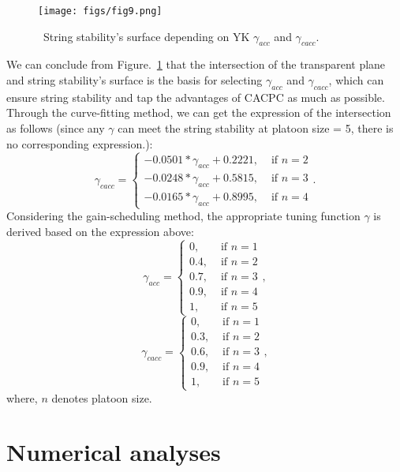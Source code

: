 \documentclass[journal]{IEEEtran}
\begin{document}
\begin{figure}
  \centering
  \texttt{[image: figs/fig9.png]}
  \caption{~String stability's surface depending on YK $\gamma_{acc}$ and $\gamma_{cacc}$.}
  \label{fig9}
\end{figure}
We can conclude from Figure.~\ref{fig9} that the intersection of the transparent plane and string stability's surface is the basis for selecting $\gamma_{acc}$ and $\gamma_{cacc}$, which can ensure string stability and tap the advantages of CACPC as much as possible. Through the curve-fitting method, we can get the expression of the intersection as follows (since any $\gamma$ can meet the string stability at platoon size = 5, there is no corresponding expression.):
\begin{equation}
  \gamma_{c a c c}= \begin{cases}-0.0501 * \gamma_{a c c}+0.2221 ,& \text { if } n=2 \\ -0.0248 * \gamma_{a c c}+0.5815 ,& \text { if } n=3 \\ -0.0165 * \gamma_{a c c}+0.8995 ,& \text { if } n=4\end{cases}.
\end{equation}
Considering the gain-scheduling method, the appropriate tuning function $\gamma$ is derived based on the expression above:
\begin{equation}
  \gamma_{a c c}=\left\{\begin{array}{cc}
    0 ,   & \text { if } n=1 \\
    0.4 , & \text { if } n=2 \\
    0.7 , & \text { if } n=3 \\
    0.9 , & \text { if } n=4 \\
    1 ,   & \text { if } n=5
  \end{array}\right.,
\end{equation}
\begin{equation}
  \gamma_{c a c c}=\left\{\begin{array}{cc}
    0 ,   & \text { if } n=1 \\
    0.3 , & \text { if } n=2 \\
    0.6 , & \text { if } n=3 \\
    0.9 , & \text { if } n=4 \\
    1 ,   & \text { if } n=5
  \end{array}\right.,
\end{equation}
where, $n$ denotes platoon size.

\section{Numerical analyses}
\label{Section 5}
\end{document}
